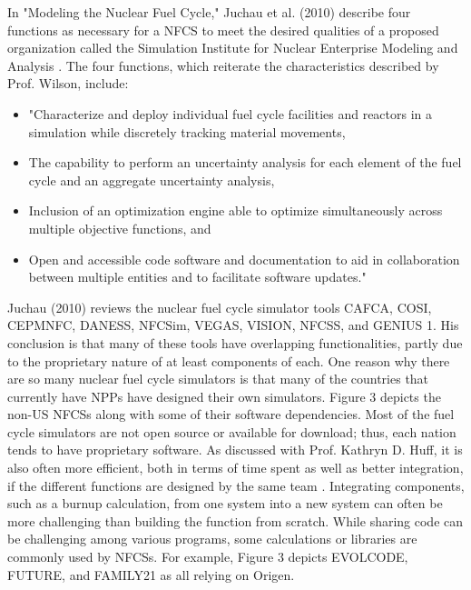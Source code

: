 \documentclass[12pt]{UIdahoMastersThesis}
\begin{document}
In "Modeling the Nuclear Fuel Cycle," Juchau et al. (2010) describe four functions as necessary for a NFCS to meet the desired qualities of a proposed organization called the Simulation Institute for Nuclear Enterprise Modeling and Analysis \cite{Juchau2010}. The four functions, which reiterate the characteristics described by Prof. Wilson, include:

\begin{itemize}
\item "Characterize and deploy individual fuel cycle facilities and reactors in a simulation while discretely tracking material movements,
\item The capability to perform an uncertainty analysis for each element of the fuel cycle and an aggregate uncertainty analysis,
\item Inclusion of an optimization engine able to optimize simultaneously across multiple objective functions, and
\item Open and accessible code software and documentation to aid in collaboration between multiple entities and to facilitate software updates."
\end{itemize}

Juchau (2010) reviews the nuclear fuel cycle simulator tools CAFCA, COSI, CEPMNFC, DANESS, NFCSim, VEGAS, VISION, NFCSS, and GENIUS 1. His conclusion is that many of these tools have overlapping functionalities, partly due to the proprietary nature of at least components of each. One reason why there are so many nuclear fuel cycle simulators is that many of the countries that currently have NPPs have designed their own simulators. Figure 3 depicts the non-US NFCSs along with some of their software dependencies. Most of the fuel cycle simulators are not open source or available for download; thus, each nation tends to have proprietary software. As discussed with Prof. Kathryn D. Huff, it is also often more efficient, both in terms of time spent as well as better integration, if the different functions are designed by the same team \cite{redfoot_huff_2016}. Integrating components, such as a burnup calculation, from one system into a new system can often be more challenging than building the function from scratch. While sharing code can be challenging among various programs, some calculations or libraries are commonly used by NFCSs. For example, Figure 3 depicts EVOLCODE, FUTURE, and FAMILY21 as all relying on Origen.
\end{document}
